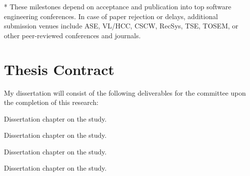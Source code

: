 * These milestones depend on acceptance and publication into top software engineering conferences. In case of paper rejection or delays, additional submission venues include ASE, VL/HCC, CSCW, RecSys, TSE, TOSEM, or other peer-reviewed conferences and journals.

\section{Thesis Contract}

My dissertation will consist of the following deliverables for the committee upon the completion of this research:

\begin{todolist}
  \item Dissertation chapter on the \peer study.
  \item Dissertation chapter on the \sorry study.
  \item Dissertation chapter on the \sugg study.
  \item Dissertation chapter on the \proc study.
\end{todolist}
